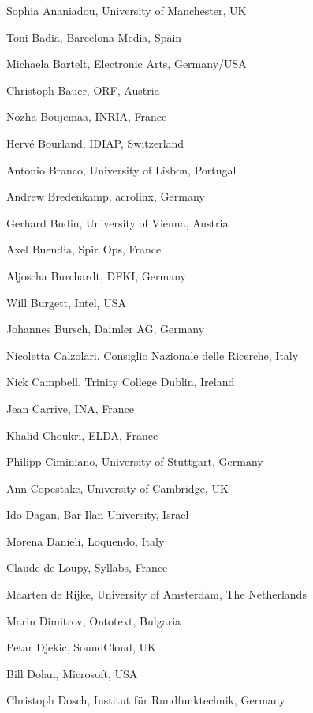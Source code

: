 \documentclass[10pt, plain]{../../metanetpaper}
\begin{document}
\begin{multicols}{3}
\begin{small}
  \begin{enumerate}
    \raggedright{
      \item Sophia Ananiadou, University of Manchester, UK
      \item Toni Badia, Barcelona Media, Spain
      \item Michaela Bartelt, Electronic Arts, Germany/USA
      \item Christoph Bauer, ORF, Austria
      \item Nozha Boujemaa, INRIA, France
      \item Hervé Bourland, IDIAP, Switzerland
      \item Antonio Branco, University of Lisbon, Portugal
      \item Andrew Bredenkamp, acrolinx, Germany
      \item Gerhard Budin, University of Vienna, Austria
      \item Axel Buendia, Spir.\,Ops, France
      \item Aljoscha Burchardt, DFKI, Germany
      \item Will Burgett, Intel, USA
      \item Johannes Bursch, Daimler AG, Germany
      \item Nicoletta Calzolari, Consiglio Nazionale delle Ricerche, Italy
      \item Nick Campbell, Trinity College Dublin, Ireland
      \item Jean Carrive, INA, France
      \item Khalid Choukri, ELDA, France
      \item Philipp Ciminiano, University of Stuttgart, Germany
      \item Ann Copestake, University of Cambridge, UK
      \item Ido Dagan, Bar-Ilan University, Israel
      \item Morena Danieli, Loquendo, Italy
      \item Claude de Loupy, Syllabs, France
      \item Maarten de Rijke, University of Amsterdam, The Netherlands
      \item Marin Dimitrov, Ontotext, Bulgaria
      \item Petar Djekic, SoundCloud, UK
      \item Bill Dolan, Microsoft, USA
      \item Christoph Dosch, Institut für Rundfunktechnik, Germany
}
\end{enumerate}
\end{small}
\end{multicols}
\end{document}
